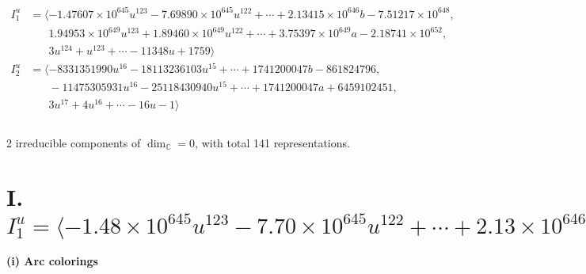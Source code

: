 \documentclass[1p]{elsarticle_modified}
\theoremstyle{definition}
\begin{document}
\begin{align*}
I^u_{1}&=\langle 
-1.47607\times10^{645} u^{123}-7.69890\times10^{645} u^{122}+\cdots+2.13415\times10^{646} b-7.51217\times10^{648},\\
\phantom{I^u_{1}}&\phantom{= \langle  }1.94953\times10^{649} u^{123}+1.89460\times10^{649} u^{122}+\cdots+3.75397\times10^{649} a-2.18741\times10^{652},\\
\phantom{I^u_{1}}&\phantom{= \langle  }3 u^{124}+u^{123}+\cdots-11348 u+1759\rangle \\
I^u_{2}&=\langle 
-8331351990 u^{16}-18113236103 u^{15}+\cdots+1741200047 b-861824796,\\
\phantom{I^u_{2}}&\phantom{= \langle  }-11475305931 u^{16}-25118430940 u^{15}+\cdots+1741200047 a+6459102451,\\
\phantom{I^u_{2}}&\phantom{= \langle  }3 u^{17}+4 u^{16}+\cdots-16 u-1\rangle \\
\\
\end{align*}
\raggedright * 2 irreducible components of $\dim_{\mathbb{C}}=0$, with total 141 representations.\\
\newpage
\renewcommand{\arraystretch}{1}
\centering \section*{I. $I^u_{1}= \langle -1.48\times10^{645} u^{123}-7.70\times10^{645} u^{122}+\cdots+2.13\times10^{646} b-7.51\times10^{648},\;1.95\times10^{649} u^{123}+1.89\times10^{649} u^{122}+\cdots+3.75\times10^{649} a-2.19\times10^{652},\;3 u^{124}+u^{123}+\cdots-11348 u+1759 \rangle$}
\flushleft \textbf{(i) Arc colorings}\\
\end{document}
